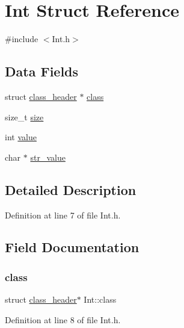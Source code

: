 \hypertarget{structInt}{}\section{Int Struct Reference}
\label{structInt}


{\ttfamily \#include $<$Int.\+h$>$}

\subsection*{Data Fields}
\begin{DoxyCompactItemize}
\item 
struct \mbox{\hyperlink{structclass__header}{class\+\_\+header}} $\ast$ \mbox{\hyperlink{structInt_aa497eee8de1a0588fe99440e34089b89}{class}}
\item 
size\+\_\+t \mbox{\hyperlink{structInt_a9a4308bb1dff85cd00c70f97bf4fbb8b}{size}}
\item 
int \mbox{\hyperlink{structInt_ab131a0721b22e28accfb39f0195413ab}{value}}
\item 
char $\ast$ \mbox{\hyperlink{structInt_aedf38abd9d2da54ad7b8889b97024d9c}{str\+\_\+value}}
\end{DoxyCompactItemize}


\subsection{Detailed Description}


Definition at line 7 of file Int.\+h.



\subsection{Field Documentation}
\mbox{\label{structInt_aa497eee8de1a0588fe99440e34089b89}} 
\subsubsection{\texorpdfstring{class}{class}}
{\footnotesize\ttfamily struct \mbox{\hyperlink{structclass__header}{class\+\_\+header}}$\ast$ Int\+::class}



Definition at line 8 of file Int.\+h.

\mbox{\label{structInt_a9a4308bb1dff85cd00c70f97bf4fbb8b}} 
